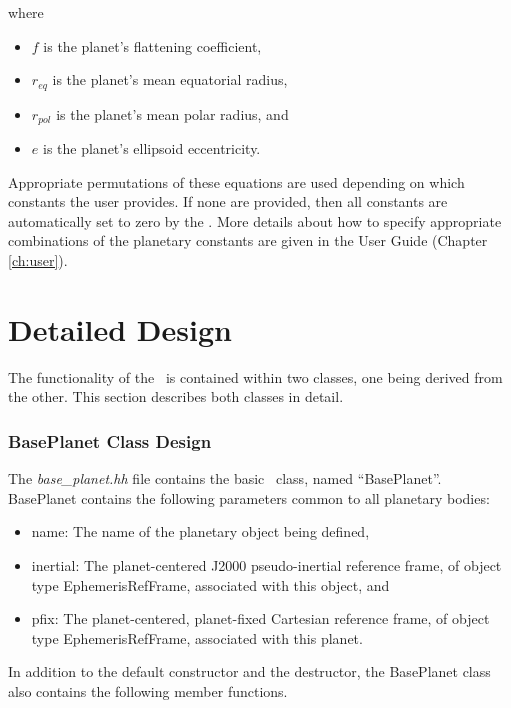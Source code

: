 where
\begin{itemize}
\item $f$ is the planet's flattening coefficient,
\item $r_{eq}$ is the planet's mean equatorial radius,
\item $r_{pol}$ is the planet's mean polar radius, and
\item $e$ is the planet's ellipsoid eccentricity.
\end{itemize}

Appropriate permutations of these equations are used depending on which
constants the user provides.  If none are provided, then all constants are
automatically set to zero by the \planetDesc.  More details about how to
specify appropriate combinations of the planetary constants
are given in the User Guide (Chapter \ref{ch:user}).


\section{Detailed Design}

The functionality of the \planetDesc\ is contained within two classes, one
being derived from the other. This section describes both classes in detail.

\subsubsection{BasePlanet Class Design}

The {\em base\_planet.hh} file contains the basic \planetDesc\ class, named
``BasePlanet''.  BasePlanet contains the following parameters common to all
planetary bodies:

\begin{itemize}
\item{name:} The name of the planetary object being defined,

\item{inertial:} The planet-centered J2000 pseudo-inertial reference frame, of
object type EphemerisRefFrame, associated with this object, and

\item{pfix:} The planet-centered, planet-fixed Cartesian reference frame, of
object type EphemerisRefFrame, associated with this planet.
\end{itemize}

In addition to the default constructor and the destructor,
the BasePlanet class also contains the following member functions.


